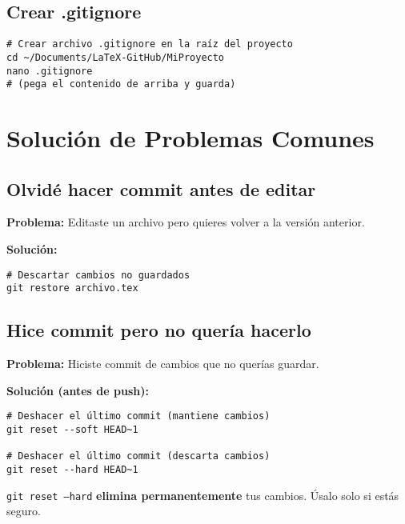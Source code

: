 \documentclass[11pt,a4paper]{article}
\begin{document}
\subsection{Crear .gitignore}

\begin{lstlisting}[style=bashstyle]
# Crear archivo .gitignore en la raíz del proyecto
cd ~/Documents/LaTeX-GitHub/MiProyecto
nano .gitignore
# (pega el contenido de arriba y guarda)
\end{lstlisting}

\section{Solución de Problemas Comunes}

\subsection{Olvidé hacer commit antes de editar}

\textbf{Problema:} Editaste un archivo pero quieres volver a la versión anterior.

\textbf{Solución:}
\begin{lstlisting}[style=bashstyle]
# Descartar cambios no guardados
git restore archivo.tex
\end{lstlisting}

\subsection{Hice commit pero no quería hacerlo}

\textbf{Problema:} Hiciste commit de cambios que no querías guardar.

\textbf{Solución (antes de push):}
\begin{lstlisting}[style=bashstyle]
# Deshacer el último commit (mantiene cambios)
git reset --soft HEAD~1

# Deshacer el último commit (descarta cambios)
git reset --hard HEAD~1
\end{lstlisting}

\begin{warningbox}
\texttt{git reset --hard} \textbf{elimina permanentemente} tus cambios. Úsalo solo si estás seguro.
\end{warningbox}
\end{document}
